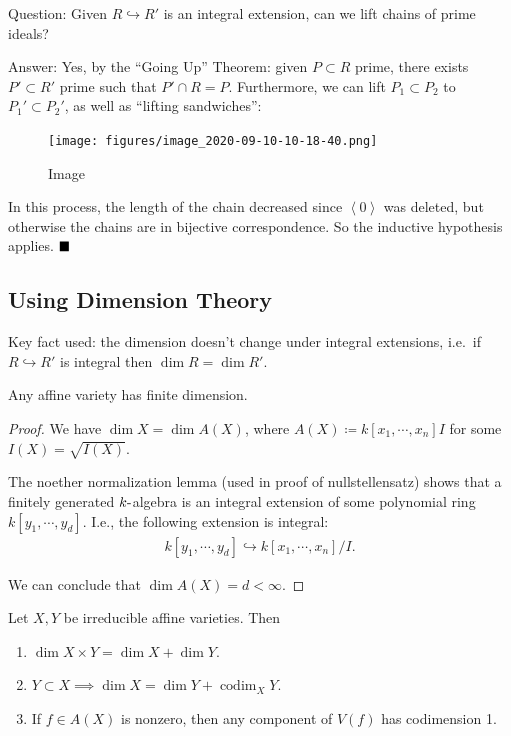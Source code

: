 Question: Given \(R\hookrightarrow R'\) is an integral extension, can we
lift chains of prime ideals?

Answer: Yes, by the ``Going Up'' Theorem: given \(P\subset R\) prime,
there exists \(P'\subset R'\) prime such that \(P'\cap R = P\).
Furthermore, we can lift \(P_1 \subset P_2\) to \(P_1' \subset P_2'\),
as well as ``lifting sandwiches'':

\begin{figure}
\centering
\texttt{[image: figures/image\_2020-09-10-10-18-40.png]}
\caption{Image}
\end{figure}

In this process, the length of the chain decreased since
\(\left\langle{0}\right\rangle\) was deleted, but otherwise the chains
are in bijective correspondence. So the inductive hypothesis applies.
\(\hfill\blacksquare\)

\hypertarget{using-dimension-theory}{%
\subsection{Using Dimension Theory}\label{using-dimension-theory}}

Key fact used: the dimension doesn't change under integral extensions,
i.e.~if \(R\hookrightarrow R'\) is integral then \(\dim R = \dim R'\).

\begin{proposition}

Any affine variety has finite dimension.

\end{proposition}

\begin{proof}

We have \(\dim X = \dim A(X)\), where
\(A(X) \coloneqq k[x_1, \cdots, x_{n}] I\) for some
\(I(X)=\sqrt{I(X)}\).

The noether normalization lemma (used in proof of nullstellensatz) shows
that a finitely generated \(k{\hbox{-}}\)algebra is an integral
extension of some polynomial ring \(k[y_1, \cdots, y_d]\). I.e., the
following extension is integral:
\begin{align*}  
k[y_1, \cdots, y_d] \hookrightarrow k[x_1, \cdots, x_n]/I
.\end{align*}

We can conclude that \(\dim A(X) = d < \infty\).

\end{proof}

\begin{proposition}[?]

Let \(X, Y\) be irreducible affine varieties. Then

\begin{enumerate}
\def\labelenumi{\alph{enumi}.}
\tightlist
\item
  \(\dim X\times Y = \dim X + \dim Y\).
\item
  \(Y\subset X \implies \dim X = \dim Y + \operatorname{codim}_X Y\).
\item
  If \(f\in A(X)\) is nonzero, then any component of \(V(f)\) has
  codimension 1.
\end{enumerate}

\end{proposition}

